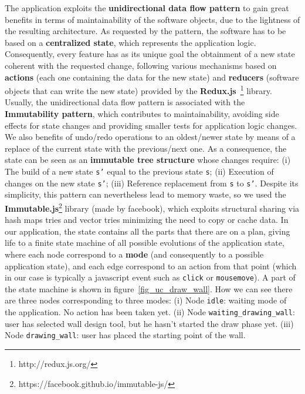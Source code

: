 The application exploits the \textbf{unidirectional data flow pattern} to gain great benefits in terms of maintainability of the software objects, due to the lightness of the resulting architecture. As requested by the pattern, the software has to be based on a \textbf{centralized state}, which represents the application logic. Consequently, every feature has as its unique goal the obtainment of a new state coherent with the requested change, following various mechanisms based on \textbf{actions} (each one containing the data for the new state) and \textbf{reducers} (software objects that can write the new state) provided by the \textbf{Redux.js}~\footnote{http://redux.js.org/} library. Usually, the unidirectional data flow pattern is associated with the \textbf{Immutability pattern}, which contributes to maintainability, avoiding side effects for state changes and providing smaller tests for application logic changes. We also benefits of undo/redo operations to an oldest/newer state by means of a replace of the current state with the previous/next one. As a consequence, the state can be seen as an \textbf{immutable tree structure} whose changes require: (i) The build of a new state \texttt{s'} equal to the previous state \texttt{s}; (ii) Execution of changes on the new state \texttt{s'}; (iii) Reference replacement from \texttt{s} to \texttt{s'}. Despite its simplicity, this pattern can nevertheless lead to memory waste, so we used the \textbf{Immutable.js}\footnote{https://facebook.github.io/immutable-js/} library (made by facebook), which exploits structural sharing via hash maps tries and vector tries minimizing the need to copy or cache data.
In our application, the state contains all the parts that there are on a plan, giving life to a finite state machine of all possible evolutions of the application state, where each node correspond to a \textbf{mode} (and consequently to a possible application state), and each edge correspond to an action from that point (which in our case is typically a javascript event such as \texttt{click} or \texttt{mousemove}). A part of the state machine is shown in figure~\ref{fig_uc_draw_wall}. How we can see there are three nodes corresponding to three modes: (i) Node \texttt{idle}: waiting mode of the application. No action has been taken yet. (ii) Node \texttt{waiting\_drawing\_wall}: user has selected wall design tool, but he hasn't started the draw phase yet. (iii) Node \texttt{drawing\_wall}: user has placed the starting point of the wall.

